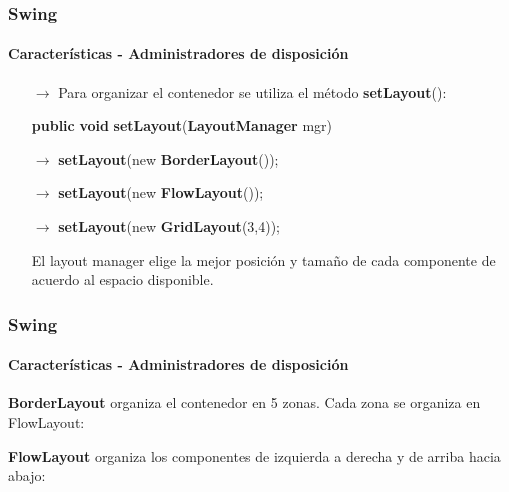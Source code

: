 \documentclass{beamer}
\begin{document}
    \begin{frame}
		\frametitle{Swing}
		\framesubtitle{Caracter\'isticas - Administradores de disposici\'on}

		\begin{itemize}
		    \item[$\rightarrow$] Para organizar el contenedor se utiliza el m\'etodo \textbf{setLayout}():
		    \item[] \textbf{public} \textbf{void} \textbf{setLayout}(\textbf{LayoutManager} mgr)
		    \item[] 
		    \item[$\rightarrow$] \textbf{setLayout}(new \textbf{BorderLayout}());
		    \item[$\rightarrow$] \textbf{setLayout}(new \textbf{FlowLayout}());
		    \item[$\rightarrow$] \textbf{setLayout}(new \textbf{GridLayout}(3,4));
		    \item[] 
		    \item[\checkmark] El layout manager elige la mejor posici\'on y tama\~no de cada componente de acuerdo al espacio disponible.
        \end{itemize}
	\end{frame}
	
	\begin{frame}
		\frametitle{Swing}
		\framesubtitle{Caracter\'isticas - Administradores de disposici\'on}

		\begin{multicols}{2}
		    \begin{center}
		        \textbf{BorderLayout} organiza el contenedor en 5 zonas. Cada zona se organiza en FlowLayout:
		    \end{center}
		    \begin{center}
		        \textbf{FlowLayout} organiza los componentes de izquierda a derecha y de arriba hacia abajo:
		    \end{center}
		\end{multicols}
	\end{frame}
	
\end{document}
